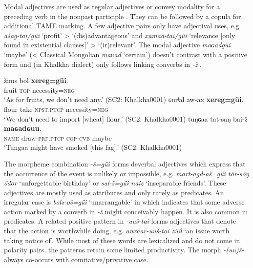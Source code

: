 \documentclass[output=paper,colorlinks,citecolor=brown,chinesefont]{langscibook}
\begin{document}

Modal adjectives are used as regular adjectives  or convey modality for a preceding verb in the nonpast participle . They can be followed by a copula for additional TAME marking. A few adjective pairs only have adjectival uses, e.g. \textit{ašag-tai/güi} ‘profit’ > ‘(dis)advantageous’ and \textit{xamaa-tai/güi} ‘relevance [only found in existential clauses]’ > ‘(ir)relevant’. The modal adjective \textit{maɢadgüi} ‘maybe’ (< Classical Mongolian \textit{maɢad} ‘certain’) doesn’t contrast with a positive form and (in Khalkha dialect) only follows linking converbs in \textit{-ž} .

\ea\label{ex:kha:68}
    \gll žims bol \textbf{xereg=güi}. \\ 
         fruit \textsc{top} necessity=\textsc{neg} \\
    \glt ‘As for fruits, we don’t need any.’ (SC2: Khalkha0001)
\z 
\ea\label{ex:kha:69}
    \gll ɢurʲal aw-ax \textbf{xereg=güi}. \\ 
         flour   take-\textsc{npst.ptcp} necessity=\textsc{neg} \\
    \glt ‘We don’t need to import [wheat] flour.’ (SC2: Khalkha0001)
\z 
\ea\label{ex:kha:70}
    \gll tuŋɢaa tat-saŋ bai-ž \textbf{maɢadɢuu}. \\ 
         \textsc{name} draw-\textsc{prf.ptcp} \textsc{cop-cvb} maybe \\
    \glt ‘Tungaa might have smoked [this fag].’ (SC2: Khalkha0001)
\z 

The morpheme combination \textit{-š=güi} forms deverbal adjectives which express that the occurrence of the event is unlikely or impossible, e.g. \textit{mart-agd-aš=güi tör-söŋ ödor} ‘unforgettable birthday’ or \textit{sal-š=güi naiz} ‘inseparable friends’. These adjectives are mostly used as attributes and only rarely as predicates. An irregular case is \textit{bolz-oš=güi} ‘unarrangable’ in  which indicates that some adverse action marked by a converb in \textit{-ž} might conceivably happen. It is also common in predicates. A related positive pattern in \textit{-uuš-tai} forms adjectives that denote that the action is worthwhile doing, e.g. \textit{anxaar-uuš-tai züil} ‘an issue worth taking notice of’. While most of these words are lexicalized and do not come in polarity pairs, the patterns retain some limited productivity. The morph \textit{-(uu)š-} always co-occurs with comitative/privative case.
\end{document}
